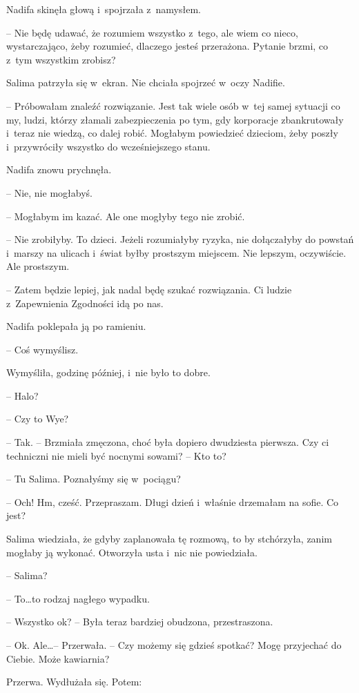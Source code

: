 \documentclass[oneside,polish,11pt,sfheadings]{mwbk}
\begin{document}
Nadifa skinęła głową i~spojrzała z~namysłem. 

-- Nie będę udawać, że
rozumiem wszystko z~tego, ale wiem co nieco, wystarczająco, żeby
rozumieć, dlaczego jesteś przerażona. Pytanie brzmi, co z~tym wszystkim
zrobisz?

Salima patrzyła się w~ekran. Nie chciała spojrzeć w~oczy Nadifie. 

-- Próbowałam znaleźć rozwiązanie. Jest tak wiele osób w~tej samej sytuacji
co my, ludzi, którzy złamali zabezpieczenia po tym, gdy korporacje
zbankrutowały i~teraz nie wiedzą, co dalej robić. Mogłabym powiedzieć
dzieciom, żeby poszły i~przywróciły wszystko do wcześniejszego stanu.

Nadifa znowu prychnęła. 

-- Nie, nie mogłabyś.

-- Mogłabym im kazać. Ale one mogłyby tego nie zrobić.

-- Nie zrobiłyby. To dzieci. Jeżeli rozumiałyby ryzyka, nie dołączałyby
do powstań i~marszy na ulicach i~świat byłby prostszym miejscem. Nie
lepszym, oczywiście. Ale prostszym.

-- Zatem będzie lepiej, jak nadal będę szukać rozwiązania. Ci ludzie z~Zapewnienia Zgodności idą po nas.

Nadifa poklepała ją po ramieniu. 

-- Coś wymyślisz.

Wymyśliła, godzinę później, i~nie było to dobre.

-- Halo?

-- Czy to Wye?

-- Tak. -- Brzmiała zmęczona, choć była dopiero dwudziesta pierwsza. Czy
ci techniczni nie mieli być nocnymi sowami? -- Kto to?

-- Tu Salima. Poznałyśmy się w~pociągu?

-- Och! Hm, cześć. Przepraszam. Długi dzień i~właśnie drzemałam na sofie.
Co jest?

Salima wiedziała, że gdyby zaplanowała tę rozmową, to by stchórzyła,
zanim mogłaby ją wykonać. Otworzyła usta i~nic nie powiedziała.

-- Salima?

-- To\ldots  to rodzaj nagłego wypadku.

-- Wszystko ok? -- Była teraz bardziej obudzona, przestraszona.

-- Ok. Ale\ldots  -- Przerwała. -- Czy możemy się gdzieś spotkać? Mogę
przyjechać do Ciebie. Może kawiarnia?

Przerwa. Wydłużała się. Potem: 
\end{document}
